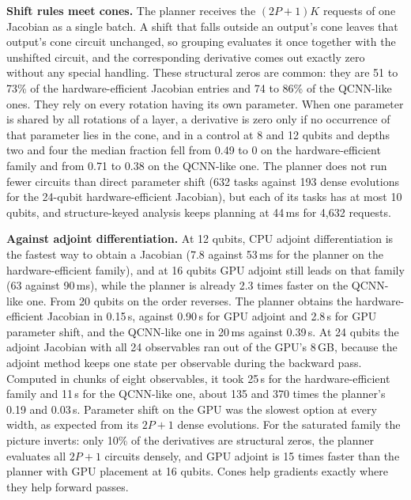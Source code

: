 \textbf{Shift rules meet cones.} The planner receives the $(2P+1)K$ requests of one Jacobian as a single batch. A shift that falls outside an output's cone leaves that output's cone circuit unchanged, so grouping evaluates it once together with the unshifted circuit, and the corresponding derivative comes out exactly zero without any special handling. These structural zeros are common: they are 51 to 73\% of the hardware-efficient Jacobian entries and 74 to 86\% of the QCNN-like ones. They rely on every rotation having its own parameter. When one parameter is shared by all rotations of a layer, a derivative is zero only if no occurrence of that parameter lies in the cone, and in a control at 8 and 12 qubits and depths two and four the median fraction fell from 0.49 to 0 on the hardware-efficient family and from 0.71 to 0.38 on the QCNN-like one. The planner does not run fewer circuits than direct parameter shift (632 tasks against 193 dense evolutions for the 24-qubit hardware-efficient Jacobian), but each of its tasks has at most 10 qubits, and structure-keyed analysis keeps planning at 44\,ms for 4,632 requests.

\textbf{Against adjoint differentiation.} At 12 qubits, CPU adjoint differentiation is the fastest way to obtain a Jacobian (7.8 against 53\,ms for the planner on the hardware-efficient family), and at 16 qubits GPU adjoint still leads on that family (63 against 90\,ms), while the planner is already 2.3 times faster on the QCNN-like one. From 20 qubits on the order reverses. The planner obtains the hardware-efficient Jacobian in 0.15\,s, against 0.90\,s for GPU adjoint and 2.8\,s for GPU parameter shift, and the QCNN-like one in 20\,ms against 0.39\,s. At 24 qubits the adjoint Jacobian with all 24 observables ran out of the GPU's 8\,GB, because the adjoint method keeps one state per observable during the backward pass. Computed in chunks of eight observables, it took 25\,s for the hardware-efficient family and 11\,s for the QCNN-like one, about 135 and 370 times the planner's 0.19 and 0.03\,s. Parameter shift on the GPU was the slowest option at every width, as expected from its $2P+1$ dense evolutions. For the saturated family the picture inverts: only 10\% of the derivatives are structural zeros, the planner evaluates all $2P+1$ circuits densely, and GPU adjoint is 15 times faster than the planner with GPU placement at 16 qubits. Cones help gradients exactly where they help forward passes.

\begin{table}[!t]
\caption{Ten Measured Gradient-Descent Steps on the Hardware-Efficient Family with $Z$ on Every Wire, Including Program or Tape Construction at Every Step.}
\label{tab:training}
\centering
\footnotesize

\end{table}


